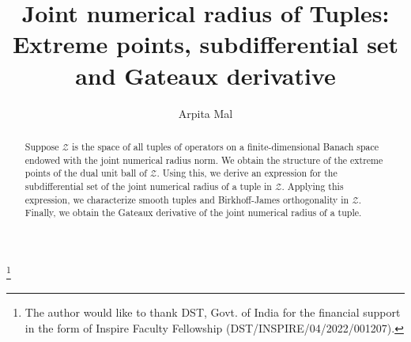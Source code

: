 \documentclass{amsart}
\theoremstyle{definition}
\theoremstyle{remark}
\numberwithin{equation}{section}
\begin{document}
	
	\title[ Joint numerical radius for tuples] {{ Joint numerical radius of Tuples: Extreme points, subdifferential set and Gateaux derivative }}
	
	
	
\author[Arpita Mal]{Arpita Mal}

\address[]{Dhirubhai Ambani University\\ Gandhinagar-382007\\ India.}


\thanks{ The author would like to thank DST, Govt. of India for the financial support in the form of Inspire Faculty Fellowship (DST/INSPIRE/04/2022/001207).}






\date{}
\maketitle
\begin{abstract}
Suppose $\mathcal{Z}$ is the space of all tuples of operators on a finite-dimensional Banach space endowed with the joint numerical radius norm. We obtain the structure of the extreme points of the dual unit ball of $\mathcal{Z}.$ Using this, we derive an expression for the subdifferential set of the joint numerical radius of a tuple in $\mathcal{Z}.$ Applying this expression, we characterize smooth tuples and Birkhoff-James orthogonality in $\mathcal{Z}.$ Finally, we obtain the Gateaux derivative of the  joint numerical radius of a tuple.  
\end{abstract}
\end{document}
